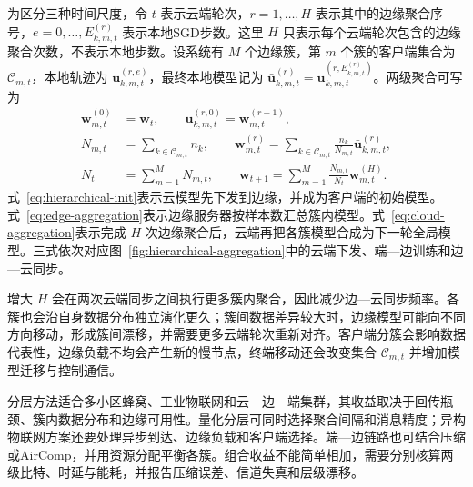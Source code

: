 为区分三种时间尺度，令 \(t\) 表示云端轮次，\(r=1,\ldots,H\) 表示其中的边缘聚合序号，\(e=0,\ldots,E_{k,m,t}^{(r)}\) 表示本地SGD步数。这里 \(H\) 只表示每个云端轮次包含的边缘聚合次数，不表示本地步数。设系统有 \(M\) 个边缘簇，第 \(m\) 个簇的客户端集合为 \(\mathcal C_{m,t}\)，本地轨迹为 \(\bm u_{k,m,t}^{(r,e)}\)，最终本地模型记为 \(\bar{\bm u}_{k,m,t}^{(r)}=\bm u_{k,m,t}^{(r,E_{k,m,t}^{(r)})}\)。两级聚合可写为
\begin{subequations}\label{eq:hierarchical-aggregation}
  \begin{align}
    \bm w_{m,t}^{(0)}&=\bm w_t,\qquad
    \bm u_{k,m,t}^{(r,0)}=\bm w_{m,t}^{(r-1)},\label{eq:hierarchical-init}\\
    N_{m,t}&=\sum_{k\in\mathcal C_{m,t}}n_k,\qquad
    \bm w_{m,t}^{(r)}
    =\sum_{k\in\mathcal C_{m,t}}\frac{n_k}{N_{m,t}}
      \bar{\bm u}_{k,m,t}^{(r)},\label{eq:edge-aggregation}\\
    N_t&=\sum_{m=1}^{M}N_{m,t},\qquad
    \bm w_{t+1}
    =\sum_{m=1}^{M}\frac{N_{m,t}}{N_t}\bm w_{m,t}^{(H)}.\label{eq:cloud-aggregation}
  \end{align}
\end{subequations}
式~\eqref{eq:hierarchical-init}表示云模型先下发到边缘，并成为客户端的初始模型。式~\eqref{eq:edge-aggregation}表示边缘服务器按样本数汇总簇内模型。式~\eqref{eq:cloud-aggregation}表示完成 \(H\) 次边缘聚合后，云端再把各簇模型合成为下一轮全局模型。三式依次对应图~\ref{fig:hierarchical-aggregation}中的云端下发、端—边训练和边—云同步。

增大 \(H\) 会在两次云端同步之间执行更多簇内聚合，因此减少边—云同步频率。各簇也会沿自身数据分布独立演化更久；簇间数据差异较大时，边缘模型可能向不同方向移动，形成簇间漂移，并需要更多云端轮次重新对齐。客户端分簇会影响数据代表性，边缘负载不均会产生新的慢节点，终端移动还会改变集合 \(\mathcal C_{m,t}\) 并增加模型迁移与控制通信。

分层方法适合多小区蜂窝、工业物联网和云—边—端集群，其收益取决于回传瓶颈、簇内数据分布和边缘可用性。量化分层可同时选择聚合间隔和消息精度；异构物联网方案还要处理异步到达、边缘负载和客户端选择\cite{Liu2023HierarchicalQuantization,Tang2023AdaptiveGradient,Wang2023HierarchicalIoT}。端—边链路也可结合压缩或AirComp，并用资源分配平衡各簇\cite{Azimi2024HierarchicalOTA}。组合收益不能简单相加，需要分别核算两级比特、时延与能耗，并报告压缩误差、信道失真和层级漂移。
